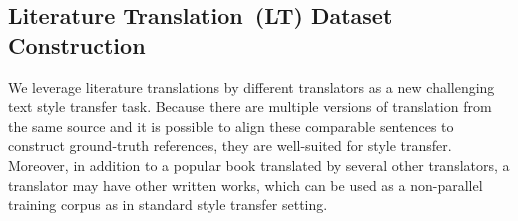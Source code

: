 \subsection{Literature Translation~(LT) Dataset Construction}
\label{sec:lt}

We leverage literature translations by different translators as a new challenging text style transfer task. Because there are multiple versions of translation from the same source and it is possible to align these comparable sentences to construct ground-truth references, they are well-suited for style transfer. Moreover, in addition to a popular book translated by several other translators, 
a translator may have other written works, which can be used as 
a non-parallel training corpus as in standard style transfer setting.
